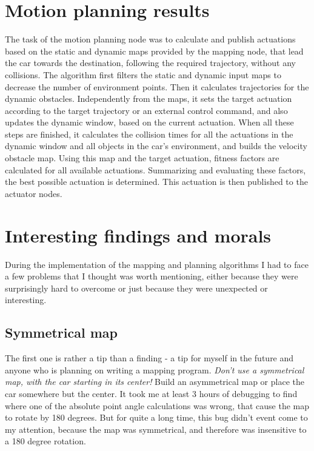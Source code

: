 \section{Motion planning results}
The task of the motion planning node was to calculate and publish actuations based on the static and dynamic maps provided by the mapping node, that lead the car towards the destination, following the required trajectory, without any collisions. The algorithm first filters the static and dynamic input maps to decrease the number of environment points. Then it calculates trajectories for the dynamic obstacles. Independently from the maps, it sets the target actuation according to the target trajectory or an external control command, and also updates the dynamic window, based on the current actuation. When all these steps are finished, it calculates the collision times for all the actuations in the dynamic window and all objects in the car's environment, and builds the velocity obstacle map. Using this map and the target actuation, fitness factors are calculated for all available actuations. Summarizing and evaluating these factors, the best possible actuation is determined. This actuation is then published to the actuator nodes.

\section{Interesting findings and morals}
During the implementation of the mapping and planning algorithms I had to face a few problems that I thought was worth mentioning, either because they were surprisingly hard to overcome or just because they were unexpected or interesting.

\subsection{Symmetrical map}
The first one is rather a tip than a finding - a tip for myself in the future and anyone who is planning on writing a mapping program. \textit{Don't use a symmetrical map, with the car starting in its center!} Build an asymmetrical map or place the car somewhere but the center. It took me at least 3 hours of debugging to find where one of the absolute point angle calculations was wrong, that cause the  map to rotate by 180 degrees. But for quite a long time, this bug didn't event come to my attention, because the map was symmetrical, and therefore was insensitive to a 180 degree rotation.

